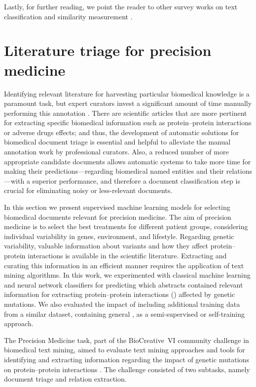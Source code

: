 Lastly, for further reading, we point the reader to other survey works on text classification \parencite{aggarwal2012a,mironczuk2018a,altinel2018a,kowsari2019a,minaee2022a} and similarity measurement \parencite{wang2020c,chandrasekaran2021a}.


\section{Literature triage for precision medicine}
\label{c4:s:literature-triage}

Identifying relevant literature for harvesting particular biomedical knowledge is a paramount task, but expert curators invest a significant amount of time manually performing this annotation \parencite{fang2012a,karp2016a}.
There are scientific articles that are more pertinent for extracting specific biomedical information such as protein--protein interactions or adverse drugs effects; and thus, the development of automatic solutions for biomedical document triage is essential and helpful to alleviate the manual annotation work by professional curators.
Also, a reduced number of more appropriate candidate documents allows automatic  systems to take more time for making their predictions---regarding biomedical named entities and their relations---with a superior performance, and therefore a document classification step is crucial for eliminating noisy or less-relevant documents.

In this section we present supervised machine learning models for selecting biomedical documents relevant for precision medicine.
The aim of precision medicine is to select the best treatments for different patient groups, considering individual variability in genes, environment, and lifestyle.
Regarding genetic variability, valuable information about variants and how they affect protein--protein interactions is available in the scientific literature.
Extracting and curating this information in an efficient manner requires the application of text mining algorithms.
In this work, we experimented with classical machine learning and neural network classifiers for predicting which  abstracts contained relevant information for extracting protein--protein interactions () affected by genetic mutations.
We also evaluated the impact of including additional training data from a similar dataset, containing general , as a semi-supervised or self-training approach.

The Precision Medicine task, part of the BioCreative~VI community challenge in biomedical text mining, aimed to evaluate text mining approaches and tools for identifying and extracting information regarding the impact of genetic mutations on protein--protein interactions \parencite{dogan2017a,dogan2019a}.
The challenge consisted of two subtasks, namely document triage and relation extraction.

